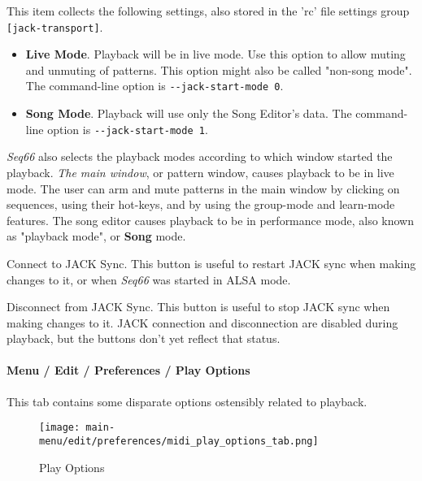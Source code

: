    This item collects the following settings, also stored in the 'rc' file
   settings group \texttt{[jack-transport]}.

   \begin{itemize}
      \item \textbf{Live Mode}.
         Playback will be in live mode.  Use this option to allow muting and
         unmuting of patterns.  This option might also be called "non-song
         mode".
         The command-line option is \texttt{-{}-jack-start-mode 0}.
      \item \textbf{Song Mode}.
         Playback will use only the Song Editor's data.
         The command-line option is \texttt{-{}-jack-start-mode 1}.
   \end{itemize}

   \textsl{Seq66} also selects the playback modes
   according to which window started the playback.
   \textsl{The main window}, or pattern
   window, causes playback to be in live mode.  The user can arm and mute
   patterns in the main window by clicking on sequences, using their hot-keys,
   and by using the group-mode and learn-mode features.
   The song editor causes playback to be in performance mode, also known as
   "playback mode", or \textbf{Song} mode.

   Connect to JACK Sync.
   This button is useful to restart JACK sync when making changes to it,
   or when \textsl{Seq66} was started in ALSA mode.

   Disconnect from JACK Sync.
   This button is useful to stop JACK sync when making changes to it.
   JACK connection and disconnection are disabled during playback, but the
   buttons don't yet reflect that status.

\paragraph{Menu / Edit / Preferences / Play Options}
\label{paragraph:menu_edit_preferences_play_options}

   This tab contains some disparate options ostensibly related to playback.

\begin{figure}[H]
   \centering 
   \texttt{[image: main-menu/edit/preferences/midi\_play\_options\_tab.png]}
   \caption{Play Options}
   \label{fig:midi_play_options_tab}
\end{figure}


